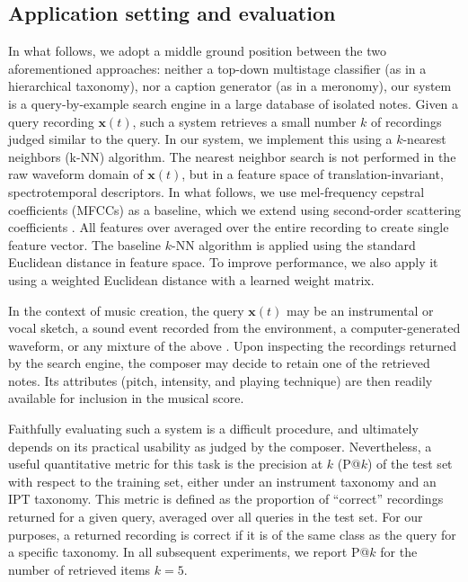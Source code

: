 \subsection{Application setting and evaluation} \label{sec:motivation}
In what follows, we adopt a middle ground position between the two aforementioned approaches: neither a top-down multistage classifier (as in a hierarchical taxonomy), nor a caption generator (as in a meronomy), our system is a query-by-example search engine in a large database of isolated notes.
Given a query recording $\boldsymbol{x}(t)$, such a system retrieves a small number $k$ of recordings judged similar to the query.
In our system, we implement this using a $k$-nearest neighbors (k-NN) algorithm.
The nearest neighbor search is not performed in the raw waveform domain of $\boldsymbol{x}(t)$, but in a feature space of translation-invariant, spectrotemporal descriptors.
In what follows, we use mel-frequency cepstral coefficients (MFCCs) as a baseline, which we extend using second-order scattering coefficients \cite{mallat2012cpam,anden2014taslp}.
All features over averaged over the entire recording to create single feature vector.
The baseline $k$-NN algorithm is applied using the standard Euclidean distance in feature space.
To improve performance, we also apply it using a weighted Euclidean distance with a learned weight matrix.

In the context of music creation, the query $\boldsymbol{x}(t)$ may be an instrumental or vocal sketch, a sound event recorded from the environment, a computer-generated waveform, or any mixture of the above \cite{maresz2013cmr}.
Upon inspecting the recordings returned by the search engine, the composer may decide to retain one of the retrieved notes.
Its attributes (pitch, intensity, and playing technique) are then readily available for inclusion in the musical score.

Faithfully evaluating such a system is a difficult procedure, and ultimately depends on its practical usability as judged by the composer.
Nevertheless, a useful quantitative metric for this task is the precision at $k$ (P@$k$) of the test set with respect to the training set, either under an instrument taxonomy and an IPT taxonomy.
This metric is defined as the proportion of ``correct'' recordings returned for a given query, averaged over all queries in the test set.
For our purposes, a returned recording is correct if it is of the same class as the query for a specific taxonomy.
In all subsequent experiments, we report P@$k$ for the number of retrieved items $k=5$.

